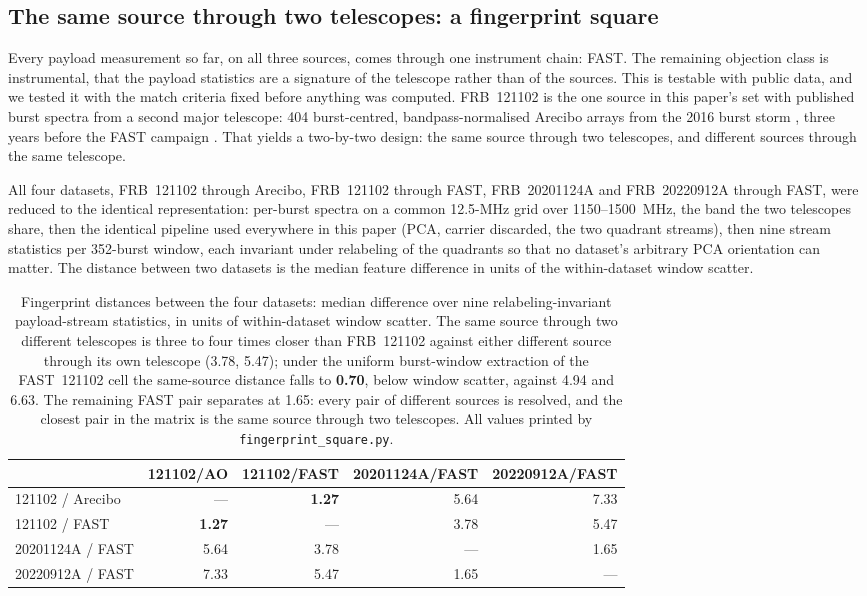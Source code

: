 \documentclass[11pt,a4paper]{article}
\newcommand{\bnum}[1]{\textbf{#1}}
\begin{document}
\subsection{The same source through two telescopes: a fingerprint square}
\label{sec:square}

Every payload measurement so far, on all three sources, comes through one instrument
chain: FAST. The remaining objection class is instrumental, that the payload
statistics are a signature of the telescope rather than of the sources. This is testable with public
data, and we tested it with the match criteria fixed before anything was computed.
FRB~121102 is the one source in this paper's set with published burst spectra from a
second major telescope: 404 burst-centred, bandpass-normalised Arecibo arrays from the
2016 burst storm \cite{hewitt2022}, three years before the FAST campaign
\cite{li2021}. That yields a two-by-two design: the same source through two
telescopes, and different sources through the same telescope.

All four datasets, FRB~121102 through Arecibo, FRB~121102 through FAST,
FRB~20201124A and FRB~20220912A through FAST, were reduced to the identical
representation: per-burst spectra on a common 12.5-MHz grid over 1150--1500~MHz, the
band the two telescopes share, then the identical pipeline used everywhere in this
paper (PCA, carrier discarded, the two quadrant streams), then nine stream statistics
per 352-burst window, each invariant under relabeling of the quadrants so that no
dataset's arbitrary PCA orientation can matter. The distance between two datasets is
the median feature difference in units of the within-dataset window scatter.

\begin{table}[htbp]
\centering
\caption{Fingerprint distances between the four datasets: median difference over nine
relabeling-invariant payload-stream statistics, in units of within-dataset window
scatter. The same source through two different telescopes is three to four times
closer than FRB~121102 against either different source through its own telescope
(3.78, 5.47); under the uniform
burst-window extraction of the FAST~121102 cell the same-source distance falls to
\bnum{0.70}, below window scatter, against 4.94 and 6.63. The remaining FAST pair
separates at 1.65: every pair of different sources is resolved, and the closest pair
in the matrix is the same source through two telescopes. All values printed by
\texttt{fingerprint\_square.py}.}
\label{tab:square}
\small
\begin{tabular}{lrrrr}
\toprule
 & 121102/AO & 121102/FAST & 20201124A/FAST & 20220912A/FAST \\
\midrule
121102 / Arecibo    & ---  & \textbf{1.27} & 5.64 & 7.33 \\
121102 / FAST       & \textbf{1.27} & ---  & 3.78 & 5.47 \\
20201124A / FAST    & 5.64 & 3.78 & ---  & 1.65 \\
20220912A / FAST    & 7.33 & 5.47 & 1.65 & ---  \\
\bottomrule
\end{tabular}
\end{table}
\end{document}
